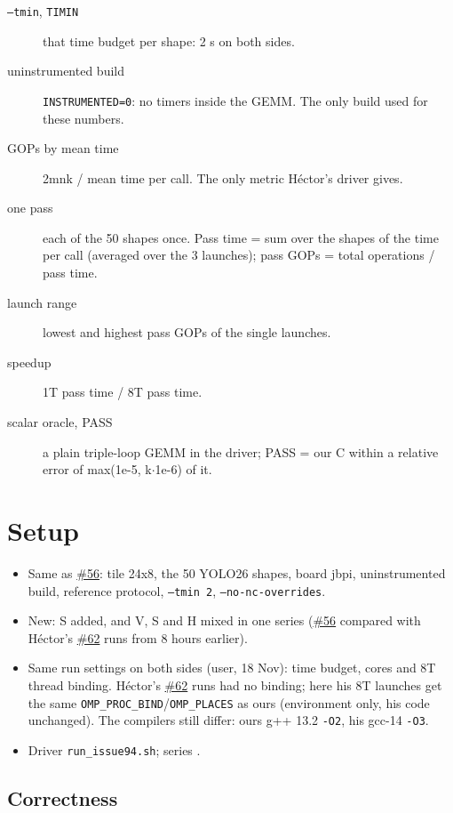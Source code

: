 \documentclass[10pt,a4paper]{article}
\newcommand{\iss}[1]{\href{https://github.com/JieGH/RVV_code_gen_via_MLIR_xDSL/issues/#1}{\##1}}
\newcommand{\D}{data}
\begin{document}
\begin{description}
\item[\texttt{--tmin}, \texttt{TIMIN}] that time budget per shape: 2 s on both sides.
\item[uninstrumented build] \texttt{INSTRUMENTED=0}: no timers inside the GEMM. The only build used for these numbers.
\item[GOPs by mean time] 2mnk / mean time per call. The only metric H\'ector's driver gives.
\item[one pass] each of the 50 shapes once. Pass time = sum over the shapes of the time per call (averaged over the 3 launches); pass GOPs = total operations / pass time.
\item[launch range] lowest and highest pass GOPs of the single launches.
\item[speedup] 1T pass time / 8T pass time.
\item[scalar oracle, PASS] a plain triple-loop GEMM in the driver; PASS = our C within a relative error of max(1e-5, k$\cdot$1e-6) of it.
\end{description}

\section{Setup}
\begin{itemize}\setlength\itemsep{1pt}
\item Same as \iss{56}: tile 24x8, the 50 YOLO26 shapes, board jbpi, uninstrumented build, reference protocol, \texttt{--tmin 2}, \texttt{--no-nc-overrides}.
\item New: S added, and V, S and H mixed in one series (\iss{56} compared with H\'ector's \iss{62} runs from 8 hours earlier).
\item Same run settings on both sides (user, 18 Nov): time budget, cores and 8T thread binding. H\'ector's \iss{62} runs had no binding; here his 8T launches get the same \texttt{OMP\_PROC\_BIND}/\texttt{OMP\_PLACES} as ours (environment only, his code unchanged). The compilers still differ: ours g++ 13.2 \texttt{-O2}, his gcc-14 \texttt{-O3}.
\item Driver \texttt{run\_issue94.sh}; series .
\end{itemize}

\subsection*{Correctness}

\end{document}
